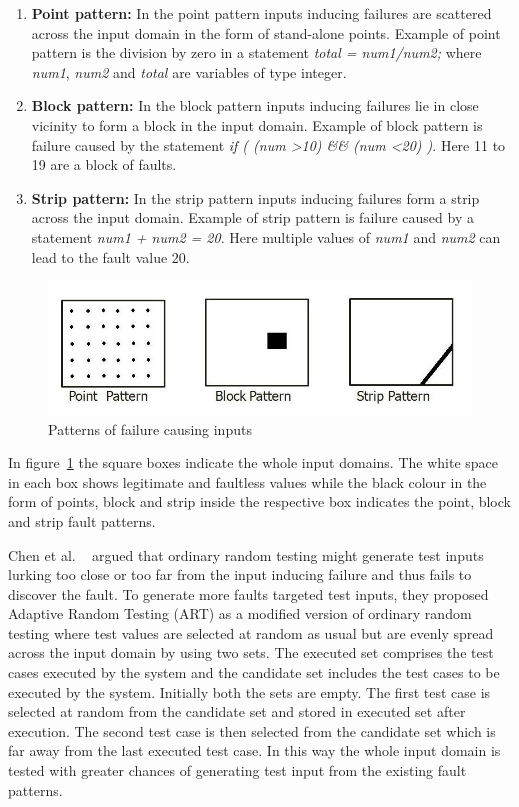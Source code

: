 \begin{enumerate}
\item {\bf Point pattern:} In the point pattern inputs inducing failures are scattered across the input domain in the form of stand-alone points. Example of point pattern is the division by zero in a statement {\it total = num1/num2;} where {\it num1}, {\it num2} and {\it total} are variables of type integer.
\item {\bf Block pattern:} In the block pattern inputs inducing failures lie in close vicinity to form a block in the input domain. Example of block pattern is failure caused by the statement {\it if ( (num \textgreater 10) \&\& (num \textless 20) )}. Here 11 to 19 are a block of faults.
\item {\bf Strip pattern:} In the strip pattern inputs inducing failures form a strip across the input domain. Example of strip pattern is failure caused by a statement {\it num1 + num2 = 20}. Here multiple values of {\it num1} and {\it num2} can lead to the fault value 20. 
\end{enumerate}

\begin{figure}[h]
	\centering
	\includegraphics[scale=0.5]{chapter3/pointblockstrip.jpg}
	\caption{Patterns of failure causing inputs}
	\label{fig:patterns2}
\end{figure}

In figure~\ref{fig:patterns2} the square boxes indicate the whole input domains. The white space in each box shows legitimate and faultless values while the black colour in the form of points, block and strip inside the respective box indicates the point, block and strip fault patterns.

Chen et al. ~\cite{Chen2008} argued that ordinary random testing might generate test inputs lurking too close or too far from the input inducing failure and thus fails to discover the fault. To generate more faults targeted test inputs, they proposed Adaptive Random Testing (ART) as a modified version of ordinary random testing where test values are selected at random as usual but are evenly spread across the input domain by using two sets. The executed set comprises the test cases executed by the system and the candidate set includes the test cases to be executed by the system. Initially both the sets are empty. The first test case is selected at random from the candidate set and stored in executed set after execution. The second test case is then selected from the candidate set which is far away from the last executed test case. In this way the whole input domain is tested with greater chances of generating test input from the existing fault patterns.

